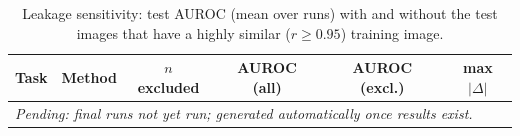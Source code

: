 \begin{table}[t]
\centering
\scriptsize
\caption{Leakage sensitivity: test AUROC (mean over runs) with and without the test images that have a highly similar ($r\geq0.95$) training image.}
\label{tab:leakage}
\begin{tabular}{clcccc}
\toprule
Task & Method & $n$ excluded & AUROC (all) & AUROC (excl.) & max $|\Delta|$\\
\midrule
\multicolumn{6}{l}{\textit{Pending: final runs not yet run; generated automatically once results exist.}}\\
\bottomrule
\end{tabular}
\end{table}
